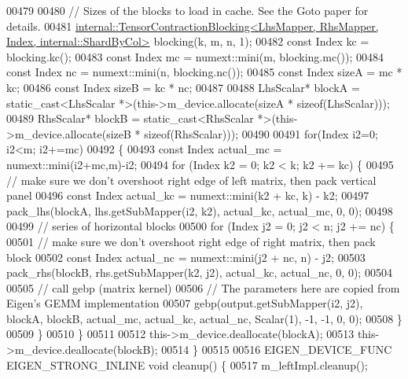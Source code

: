 \begin{DoxyCode}
00479 
00480     \textcolor{comment}{// Sizes of the blocks to load in cache. See the Goto paper for details.}
00481     
      \hyperlink{class_eigen_1_1internal_1_1_tensor_contraction_blocking}{internal::TensorContractionBlocking<LhsMapper, RhsMapper, Index, internal::ShardByCol>}
       blocking(k, m, n, 1);
00482     \textcolor{keyword}{const} Index kc = blocking.kc();
00483     \textcolor{keyword}{const} Index mc = numext::mini(m, blocking.mc());
00484     \textcolor{keyword}{const} Index nc = numext::mini(n, blocking.nc());
00485     \textcolor{keyword}{const} Index sizeA = mc * kc;
00486     \textcolor{keyword}{const} Index sizeB = kc * nc;
00487 
00488     LhsScalar* blockA = \textcolor{keyword}{static\_cast<}LhsScalar *\textcolor{keyword}{>}(this->m\_device.allocate(sizeA * \textcolor{keyword}{sizeof}(LhsScalar)));
00489     RhsScalar* blockB = \textcolor{keyword}{static\_cast<}RhsScalar *\textcolor{keyword}{>}(this->m\_device.allocate(sizeB * \textcolor{keyword}{sizeof}(RhsScalar)));
00490 
00491     \textcolor{keywordflow}{for}(Index i2=0; i2<m; i2+=mc)
00492     \{
00493       \textcolor{keyword}{const} Index actual\_mc = numext::mini(i2+mc,m)-i2;
00494       \textcolor{keywordflow}{for} (Index k2 = 0; k2 < k; k2 += kc) \{
00495         \textcolor{comment}{// make sure we don't overshoot right edge of left matrix, then pack vertical panel}
00496         \textcolor{keyword}{const} Index actual\_kc = numext::mini(k2 + kc, k) - k2;
00497         pack\_lhs(blockA, lhs.getSubMapper(i2, k2), actual\_kc, actual\_mc, 0, 0);
00498 
00499         \textcolor{comment}{// series of horizontal blocks}
00500         \textcolor{keywordflow}{for} (Index j2 = 0; j2 < n; j2 += nc) \{
00501           \textcolor{comment}{// make sure we don't overshoot right edge of right matrix, then pack block}
00502           \textcolor{keyword}{const} Index actual\_nc = numext::mini(j2 + nc, n) - j2;
00503           pack\_rhs(blockB, rhs.getSubMapper(k2, j2), actual\_kc, actual\_nc, 0, 0);
00504 
00505           \textcolor{comment}{// call gebp (matrix kernel)}
00506           \textcolor{comment}{// The parameters here are copied from Eigen's GEMM implementation}
00507           gebp(output.getSubMapper(i2, j2), blockA, blockB, actual\_mc, actual\_kc, actual\_nc, Scalar(1), -1,
       -1, 0, 0);
00508         \}
00509       \}
00510     \}
00511 
00512     this->m\_device.deallocate(blockA);
00513     this->m\_device.deallocate(blockB);
00514   \}
00515 
00516   EIGEN\_DEVICE\_FUNC EIGEN\_STRONG\_INLINE \textcolor{keywordtype}{void} cleanup() \{
00517     m\_leftImpl.cleanup();

\end{DoxyCode}
